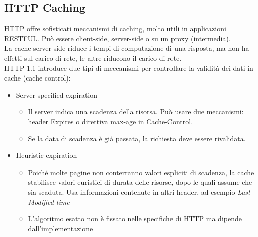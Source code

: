\documentclass[a4paper,12pt]{article}
\begin{document}
\subsection{HTTP Caching}
HTTP offre sofisticati meccanismi di caching, molto utili in applicazioni RESTFUL. Può essere client-side, server-side o su un proxy (intermedia). \\
La cache server-side riduce i tempi di computazione di una risposta, ma non ha effetti sul carico di rete, le altre riducono il carico di rete. \\
HTTP 1.1 introduce due tipi di meccanismi per controllare la validità dei dati in cache (cache control):
\begin{itemize}
  \item Server-specified expiration
  \begin{itemize}
    \item Il server indica una scadenza della risorsa. Può usare due meccanismi: header Expires o direttiva max-age in Cache-Control.
    \item Se la data di scadenza è già passata, la richiesta deve essere rivalidata.
  \end{itemize}
  \item Heuristic expiration
  \begin{itemize}
    \item Poiché molte pagine non conterranno valori espliciti di scadenza, la cache stabilisce valori euristici di durata delle risorse, dopo le quali assume che sia scaduta. Usa informazioni contenute in altri header, ad esempio \textit{Last-Modified time}
    \item L'algoritmo esatto non è fissato nelle specifiche di HTTP ma dipende dall'implementazione
  \end{itemize}
\end{itemize}
\section{}
\end{document}
